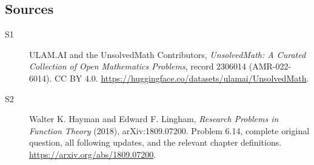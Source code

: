 \documentclass[11pt]{book}
\begin{document}
\subsection{Sources}
\begin{description}
\item[\hypertarget{source:2306014:1}{S1}] ULAM.AI and the UnsolvedMath Contributors, \emph{UnsolvedMath: A Curated Collection of Open Mathematics Problems}, record 2306014 (AMR-022-6014). CC BY 4.0. \url{https://huggingface.co/datasets/ulamai/UnsolvedMath}.
\item[\hypertarget{source:2306014:2}{S2}] Walter K. Hayman and Edward F. Lingham, \emph{Research Problems in Function Theory} (2018), arXiv:1809.07200. Problem 6.14, complete original question, all following updates, and the relevant chapter definitions. \url{https://arxiv.org/abs/1809.07200}.
\end{description}
\label{end:2306014}
\end{document}
